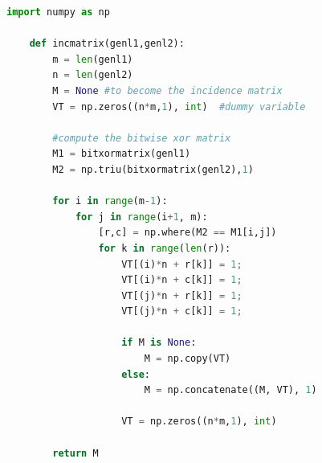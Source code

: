 \begin{lstlisting}[language=Python]
    import numpy as np

    def incmatrix(genl1,genl2):
        m = len(genl1)
        n = len(genl2)
        M = None #to become the incidence matrix
        VT = np.zeros((n*m,1), int)  #dummy variable

        #compute the bitwise xor matrix
        M1 = bitxormatrix(genl1)
        M2 = np.triu(bitxormatrix(genl2),1)

        for i in range(m-1):
            for j in range(i+1, m):
                [r,c] = np.where(M2 == M1[i,j])
                for k in range(len(r)):
                    VT[(i)*n + r[k]] = 1;
                    VT[(i)*n + c[k]] = 1;
                    VT[(j)*n + r[k]] = 1;
                    VT[(j)*n + c[k]] = 1;

                    if M is None:
                        M = np.copy(VT)
                    else:
                        M = np.concatenate((M, VT), 1)

                    VT = np.zeros((n*m,1), int)

        return M
\end{lstlisting}


